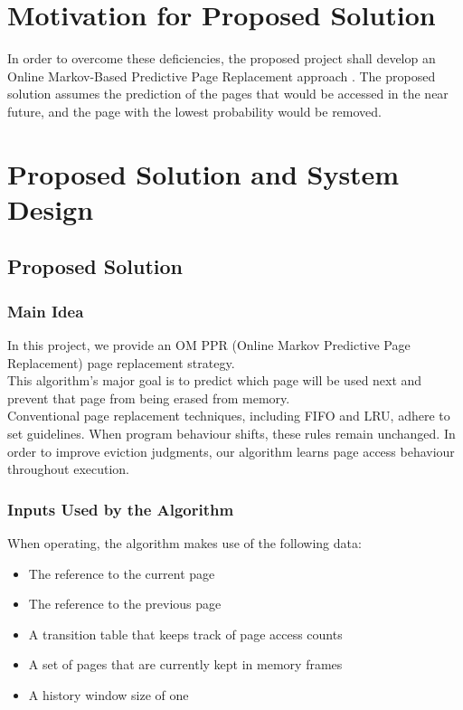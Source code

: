 \documentclass[conference]{IEEEtran}
\begin{document}
\section{\textbf{Motivation for Proposed Solution}}

In order to overcome these deficiencies, the proposed project shall develop an Online Markov-Based Predictive Page Replacement approach \cite{lee2017machine,jain2016online}. The proposed solution assumes the prediction of the pages that would be accessed in the near future, and the page with the lowest probability would be removed.

\section{\textbf{Proposed Solution and System Design}}

\subsection{Proposed Solution}

\subsubsection{Main Idea}

In this project, we provide an OM PPR (Online Markov Predictive Page Replacement) page replacement strategy.\\
This algorithm's major goal is to predict which page will be used next and prevent that page from being erased from memory.\\
Conventional page replacement techniques, including FIFO and LRU, adhere to set guidelines. When program behaviour shifts, these rules remain unchanged. In order to improve eviction judgments, our algorithm learns page access behaviour throughout execution.
\vspace{0.7\baselineskip}


\subsubsection{Inputs Used by the Algorithm}

When operating, the algorithm makes use of the following data:

\begin{itemize}
\item The reference to the current page
\item The reference to the previous page
\item A transition table that keeps track of page access counts
\item A set of pages that are currently kept in memory frames
\item A history window size of one
\end{itemize}
\end{document}
